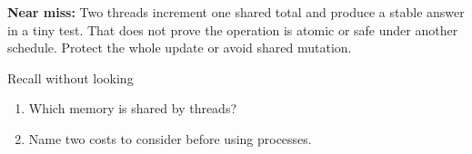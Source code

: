 \documentclass[11pt]{article}
\begin{document}
\begin{keepsection}
\begin{notebox}\textbf{Near miss:} Two threads increment one shared total and produce a stable answer in a tiny test. That does not prove the operation is atomic or safe under another schedule. Protect the whole update or avoid shared mutation.\end{notebox}

\begin{recallbox}{Recall without looking}
\begin{enumerate}
\item Which memory is shared by threads?
\item Name two costs to consider before using processes.
\end{enumerate}

\end{recallbox}
\end{keepsection}
\end{document}

